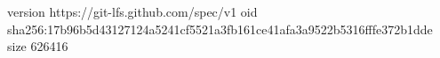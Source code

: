 version https://git-lfs.github.com/spec/v1
oid sha256:17b96b5d43127124a5241cf5521a3fb161ce41afa3a9522b5316fffe372b1dde
size 626416
